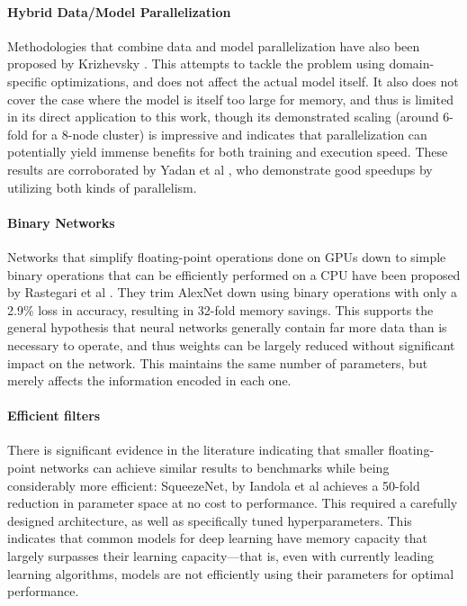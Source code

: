 \documentclass[10pt,twocolumn,letterpaper]{article}
\begin{document}
\paragraph{Hybrid Data/Model Parallelization}
Methodologies that combine data and model parallelization have also been proposed by Krizhevsky \cite{krizhevsky2014one}.
This attempts to tackle the problem using domain-specific optimizations, and does not affect the actual model itself. 
It also does not cover the case where the model is itself too large for memory, and thus is limited in its direct application to this work, though its demonstrated scaling (around 6-fold for a 8-node cluster) is impressive and indicates that parallelization can potentially yield immense benefits for both training and execution speed.
These results are corroborated by Yadan et al \cite{yadan2013multi}, who demonstrate good speedups by utilizing both kinds of parallelism.

\paragraph{Binary Networks}
Networks that simplify floating-point operations done on GPUs down to simple binary operations that can be efficiently performed on a CPU have been proposed by Rastegari et al \cite{rastegari2016xnor}.
They trim AlexNet down using binary operations with only a 2.9\% loss in accuracy, resulting in 32-fold memory savings.
This supports the general hypothesis that neural networks generally contain far more data than is necessary to operate, and thus weights can be largely reduced without significant impact on the network.
This maintains the same number of parameters, but merely affects the information encoded in each one.

\paragraph{Efficient filters}
There is significant evidence in the literature indicating that smaller floating-point networks can achieve similar results to benchmarks while being considerably more efficient: SqueezeNet, by Iandola et al \cite{iandola2016squeezenet} achieves a 50-fold reduction in parameter space at no cost to performance.
This required a carefully designed architecture, as well as specifically tuned hyperparameters.
This indicates that common models for deep learning have memory capacity that largely surpasses their learning capacity---that is, even with currently leading learning algorithms, models are not efficiently using their parameters for optimal performance.
\end{document}
